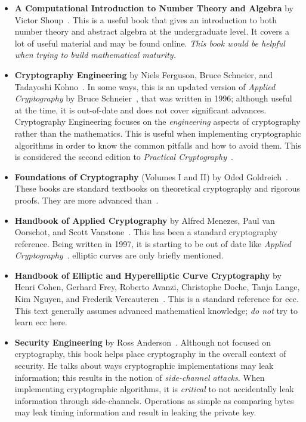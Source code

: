 \begin{itemize}
\item \textbf{A Computational Introduction to Number Theory and Algebra}
    by Victor Shoup~\cite{ComputationalIntroNTA}.
    This is a useful book that gives an introduction to both
    \gls{number theory} and abstract algebra at the undergraduate level.
    It covers a lot of useful material and may be found online.
    \emph{This book would be helpful when trying to build
    mathematical maturity.}
\item \textbf{Cryptography Engineering}
    by Niels Ferguson, Bruce Schneier, and Tadayoshi Koh\-no~\cite{CryptoEng}.
    In some ways, this is an updated version of \emph{Applied Cryptography}
    by Bruce Schneier~\cite{AppliedCrypto},
    that was written in 1996;
    although useful at the time, it is out-of-date and does not cover
    significant advances.
    Cryptography Engineering focuses on the \emph{engineering}
    aspects of cryptography rather than the mathematics.
    This is useful when implementing cryptographic algorithms in order
    to know the common pitfalls and how to avoid them.
    This is considered the second edition to
    \emph{Practical Cryptography}~\cite{PracticalCryptography}.
\item \textbf{Foundations of Cryptography} (Volumes I and II)
    by Oded Goldreich~\cite{FoundationsCrypto1,FoundationsCrypto2}.
    These books are standard textbooks on theoretical cryptography
    and rigorous proofs.
    They are more advanced than~\cite{IntroModernCrypto}.
\item \textbf{Handbook of Applied Cryptography}
    by Alfred Menezes, Paul van Oorschot,
    and Scott Vanstone~\cite{HandbookAppliedCrypto}.
    This has been a standard cryptography reference.
    Being written in 1997, it is starting to be out of date
    like \emph{Applied Cryptography}~\cite{AppliedCrypto}.
    \Glspl{elliptic curve} are only briefly mentioned.
\item \textbf{Handbook of Elliptic and Hyperelliptic Curve Cryptography}
    by Henri Cohen, Gerhard Frey, Roberto Avanzi, Christophe Doche,
    Tanja Lange, Kim Nguyen, and Frederik Vercauteren~\cite{HandbookECC}.
    This is a standard reference for \gls{ecc}.
    This text generally assumes advanced mathematical knowledge;
    \emph{do not} try to learn \gls{ecc} here.
\item \textbf{Security Engineering} by Ross Anderson~\cite{SecurityEng}.
    Although not focused on cryptography,
    this book helps place cryptography in the overall context of security.
    He talks about ways cryptographic implementations may leak information;
    this results in the notion of \emph{side-channel attacks}.
    When implementing cryptographic algorithms,
    it is \emph{critical} to not accidentally leak information
    through side-channels.
    Operations as simple as comparing bytes may leak timing information
    and result in leaking the private key.
\end{itemize}

